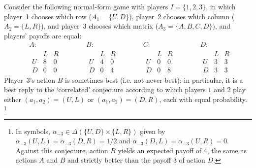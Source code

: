\begin{example}
	\label{example:rbty_indep}
	Consider the following normal-form game with players $I = \{1,2,3\}$, in which player~1 chooses which row ($A_1 = \{U,D\}$), player~2 chooses which column ($A_2 = \{L,R\}$), and player~3 chooses which matrix ($A_3 = \{A,B,C,D\})$, and players' payoffs are equal:
	\begin{equation*}
		\begin{aligned}
			&A:\\
			&\begin{array}{c|cc}
				  & L & R \\ \hline
				U & 8 & 0 \\
				D & 0 & 0
			\end{array}
		\end{aligned}
		\qquad
		\begin{aligned}
			&B:\\
			&\begin{array}{c|cc}
				  & L & R \\ \hline
				U & 4 & 0 \\
				D & 0 & 4
			\end{array}
		\end{aligned}
		\qquad
		\begin{aligned}
			&C:\\
			&\begin{array}{c|cc}
				  & L & R \\ \hline
				U & 0 & 0 \\
				D & 0 & 8
			\end{array}
		\end{aligned}
		\qquad
		\begin{aligned}
			&D:\\
			&\begin{array}{c|cc}
				  & L & R \\ \hline
				U & 3 & 3 \\
				D & 3 & 3
			\end{array}
		\end{aligned}
	\end{equation*}
	Player~3's action $B$ is sometimes-best (i.e. not never-best): in particular, it is a best reply to the `correlated' conjecture according to which players $1$ and $2$ play either $(a_1,a_2) = (U,L)$ or $(a_1,a_2) = (D,R)$, each with equal probability.%
		\footnote{In symbols, $\alpha_{-3} \in \Delta(\{U,D\} \times \{L,R\})$ given by $\alpha_{-3}(U,L) = \alpha_{-3}(D,R) = 1/2$ and $\alpha_{-3}(D,L) = \alpha_{-3}(U,R) = 0$. Against this conjecture, action $B$ yields an expected payoff of $4$, the same as actions $A$ and $B$ and strictly better than the payoff $3$ of action $D$.}

\end{example}

